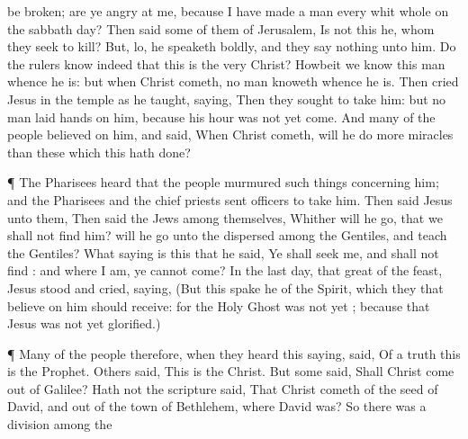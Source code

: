 {{{be broken;
are ye angry
at me,
because
I have made
a man
every whit
whole
on
the sabbath day?}}
Then
said
some
of them of
Jerusalem,
Is
not
this
he,
whom they
seek to
kill?
But,
lo, he
speaketh
boldly,
and they
say
nothing unto
him.
Do the
rulers
know
indeed
that
this
is the
very
Christ?
Howbeit we
know this
man
whence he
is:
but
when
Christ
cometh, no
man
knoweth
whence he
is.
Then
cried
Jesus
in the
temple as he
taught,
saying,
{}
Then they
sought to
take
him:
but no
man
laid
hands
on
him,
because
his
hour
was not
yet
come.
And
many
of the
people
believed
on
him,
and
said,
When
Christ
cometh, will he
do
more
miracles than
these
which
this
{} hath
done?
\par }{\PP {}¶ The
Pharisees
heard
that the
people
murmured such
things
concerning
him;
and the
Pharisees
and the chief
priests
sent
officers
to
take
him.
Then
said
Jesus unto
them,
{}
Then
said the
Jews
among
themselves,
Whither
will
he
go,
that
we
shall
not
find
him? will
he
go
unto the
dispersed among the
Gentiles,
and
teach the
Gentiles?
What
{}
saying
is
this
that he
said, Ye shall
seek
me,
and
shall
not
find
{}:
and
where
I
am,
{}
ye
cannot
come?
In the
last
day,
that
great
{} of the
feast,
Jesus
stood
and
cried,
saying,
{}
(But
this spake
he
of the
Spirit,
which they that
believe
on
him
should
receive:
for
the
Holy
Ghost
was not
yet
{}; because
that
Jesus
was not
yet
glorified.)
\par }{\PP {}¶
Many
of the
people
therefore, when they
heard this
saying,
said, Of a
truth
this
is the
Prophet.
Others
said,
This
is the
Christ.
But
some
said,
Shall
Christ
come out
of
Galilee?
Hath
not the
scripture
said,
That
Christ
cometh
of the
seed of
David,
and
out of the
town of
Bethlehem,
where
David
was?
So there
was a
division
among the
}
